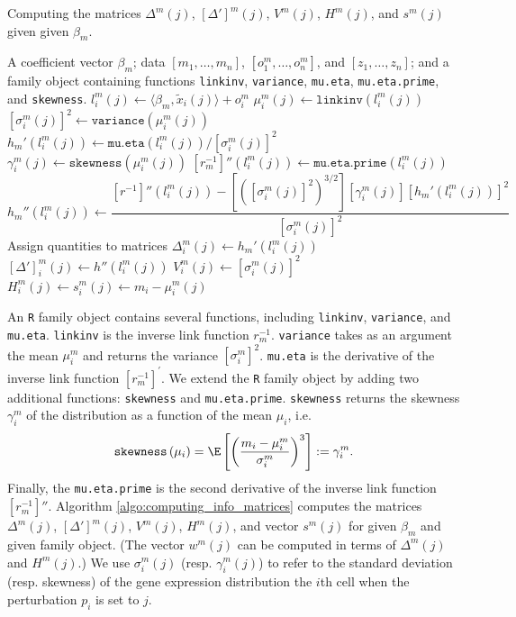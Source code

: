 \documentclass[12pt]{article}
\begin{document}
\begin{appendices}
\begin{algorithm}
	\caption{Computing the matrices $\Delta^m(j)$, $[\Delta']^m(j)$, $V^m(j)$, $H^m(j)$, and $s^m(j)$ given given $\beta_m$.}\label{algo:computing_info_matrices}
	\begin{algorithmic}[3]
		\Require A coefficient vector $\beta_m$; data $[m_1, \dots, m_n]$, $[o^m_1, \dots, o^m_n]$, and $[z_1, \dots, z_n]$; and a family object containing functions \texttt{linkinv}, \texttt{variance}, \texttt{mu.eta}, \texttt{mu.eta.prime}, and \texttt{skewness}.
		\State $l^m_i(j) \gets \langle \beta_m, \tilde{x}_i(j) \rangle + o^m_i$
		\State $\mu^m_i(j) \gets \texttt{linkinv}(l^m_i(j))$
		\State $[\sigma_i^m(j)]^2 \gets \texttt{variance}(\mu_i^m(j))$
		\State $h_m'(l_i^m(j)) \gets \texttt{mu.eta}(l_i^m(j))/[\sigma_i^m(j)]^2$
		\State $\gamma^m_i(j) \gets \texttt{skewness}(\mu^m_i(j))$
		\State $[r_m^{-1}]''(l_i^m(j)) \gets \texttt{mu.eta.prime}(l^m_i(j))$
		\State $$h_m''(l_i^m(j)) \gets \frac{[r^{-1}]''(l_i^m(j)) - [([\sigma_i^m(j)]^2)^{3/2}][\gamma^m_i(j)] [h_m'(l_i^m(j))]^2}{[\sigma_i^m(j)]^2}$$
		\Comment Assign quantities to matrices
		\State $\Delta_{i}^m(j) \gets h_m'( l_i^m(j))$
		\State $[\Delta']^m_{i}(j) \gets h''(l^m_i(j))$
		\State $V^m_{i}(j) \gets [\sigma^m_i(j)]^2$
		\State $H^m_{i}(j) \gets s^m_i(j) \gets m_i - \mu^m_i(j)$
		\EndFor
		\EndFor
	\end{algorithmic}
\end{algorithm}

An \texttt{R} family object contains several functions, including \texttt{linkinv}, \texttt{variance}, and \texttt{mu.eta}. \texttt{linkinv} is the inverse link function $r_m^{-1}$. \texttt{variance} takes as an argument the mean $\mu^m_i$ and returns the variance $[\sigma_i^m]^2$. \texttt{mu.eta} is the derivative of the inverse link function $[r^{-1}_m]^{'}$. We extend the \texttt{R} family object by adding two additional functions: \texttt{skewness} and \texttt{mu.eta.prime}. \texttt{skewness} returns the skewness $\gamma^m_i$ of the distribution as a function of the mean $\mu_i$, i.e. $$\texttt{skewness}\left(\mu_i\right) = \E \left[\left(\frac{m_i - \mu_i^m}{ \sigma_i^m}\right)^3\right] := \gamma_i^m.$$ Finally, the \texttt{mu.eta.prime} is the second derivative of the inverse link function $[r^{-1}_m]''.$ Algorithm \ref{algo:computing_info_matrices} computes the matrices $\Delta^m(j)$, $[\Delta']^m(j)$, $V^m(j)$, $H^m(j)$, and vector $s^m(j)$ for given $\beta_m$ and given family object. (The vector $w^m(j)$ can be computed in terms of $\Delta^m(j)$ and $H^m(j)$.) We use $\sigma^m_i(j)$ (resp. $\gamma^m_i(j)$) to refer to the standard deviation (resp. skewness) of the gene expression distribution the $i$th cell when the perturbation $p_i$ is set to $j$.


\end{appendices}
\end{document}
